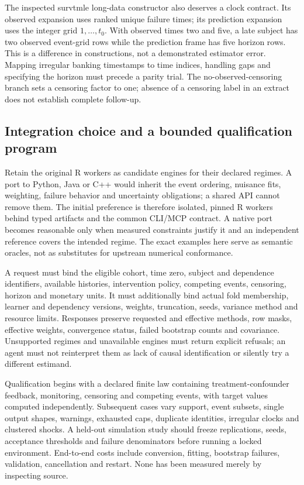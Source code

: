 The inspected survtmle long-data constructor also deserves a clock contract.
Its observed expansion uses ranked unique failure times; its prediction
expansion uses the integer grid $1,\ldots,t_0$. With observed times two and
five, a late subject has two observed event-grid rows while the prediction
frame has five horizon rows. This is a difference in constructions, not a
demonstrated estimator error. Mapping irregular banking timestamps to time
indices, handling gaps and specifying the horizon must precede a parity trial.
The no-observed-censoring branch sets a censoring factor to one; absence of a
censoring label in an extract does not establish complete follow-up.
\citep{exec23_longr_survtmle,exec23_longr_reference}

\subsection{Integration choice and a bounded qualification program}
Retain the original R workers as candidate engines for their declared regimes.
A port to Python, Java or C++ would inherit the event ordering, nuisance fits,
weighting, failure behavior and uncertainty obligations; a shared API cannot
remove them. The initial preference is therefore isolated, pinned R workers
behind typed artifacts and the common CLI/MCP contract. A native port becomes
reasonable only when measured constraints justify it and an independent
reference covers the intended regime. The exact examples here serve as
semantic oracles, not as substitutes for upstream numerical conformance.

A request must bind the eligible cohort, time zero, subject and dependence
identifiers, available histories, intervention policy, competing events,
censoring, horizon and monetary units. It must additionally bind actual fold
membership, learner and dependency versions, weights, truncation, seeds,
variance method and resource limits. Responses preserve requested and effective
methods, row masks, effective weights, convergence status, failed bootstrap
counts and covariance. Unsupported regimes and unavailable engines must return
explicit refusals; an agent must not reinterpret them as lack of causal
identification or silently try a different estimand.

Qualification begins with a declared finite law containing treatment-confounder
feedback, monitoring, censoring and competing events, with target values
computed independently. Subsequent cases vary support, event subsets, single
output shapes, warnings, exhausted caps, duplicate identities, irregular
clocks and clustered shocks. A held-out simulation study should freeze
replications, seeds, acceptance thresholds and failure denominators before
running a locked environment. End-to-end costs include conversion, fitting,
bootstrap failures, validation, cancellation and restart. None has been
measured merely by inspecting source.

